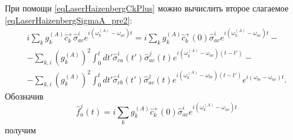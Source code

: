 При помощи \eqref{eqLaserHaizenbergCkPlus} можно вычислить второе
слагаемое \eqref{eqLaserHaizenbergSigmaA_pre2}:
\begin{eqnarray}
i
\sum_{k}
g_k^{(A)}
\hat{c}_k^{+}\hat{\sigma}^{i}_{ac}  
e^{i\left(\omega_k^{(A)} - \omega_{ac}\right)t} = 
i
\sum_{k}
g_k^{(A)}
\hat{c}_k^{+}\left(0\right)\hat{\sigma}^{i}_{ac}  
e^{i\left(\omega_k^{(A)} - \omega_{ac}\right)t} -
\nonumber \\
-
\sum_{k,i} 
\left(g_{k}^{(A)}\right)^2
\int_0^t d t'
\hat{\sigma}_{ca}^{i}\left(t'\right)\hat{\sigma}^{j}_{ac}\left(t\right) 
e^{i\left(\omega_{k}^{(A)} - \omega_{ac}\right)\left(t-t'\right)}
-
\nonumber \\
-
\sum_{k,i} 
\left(g_{k}^{(A)}\right)^2
\int_0^t d t'
\hat{\sigma}_{cb}^{i}\left(t'\right)\hat{\sigma}^{j}_{ac}\left(t\right) 
e^{i\left(\omega_{k}^{(A)} - \omega_{bc}\right)\left(t-t'\right)}
e^{i\left(\omega_{bc} - \omega_{ac}\right)t}.
\nonumber
\end{eqnarray}
Обозначив
\begin{equation}
\hat{f}_{a}^{j}\left(t\right) = i
\sum_{k}
g_k^{(A)}
\hat{c}_k^{+}\left(0\right)\hat{\sigma}^{i}_{ac}  
e^{i\left(\omega_k^{(A)} - \omega_{ac}\right)t}
\label{eqLaserHaizenbergFAJ}
\end{equation}
получим
